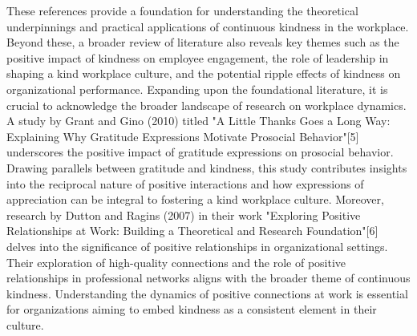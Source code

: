 \documentclass[a4paper, 11pt]{report}
\begin{document}
These references provide a foundation for understanding the theoretical underpinnings and practical applications of continuous kindness in the workplace. Beyond these, a broader review of literature also reveals key themes such as the positive impact of kindness on employee engagement, the role of leadership in shaping a kind workplace culture, and the potential ripple effects of kindness on organizational performance.
\vspace{5mm} %
\newline
Expanding upon the foundational literature, it is crucial to acknowledge the broader landscape of research on workplace dynamics. A study by Grant and Gino (2010) titled "A Little Thanks Goes a Long Way: Explaining Why Gratitude Expressions Motivate Prosocial Behavior"[5] underscores the positive impact of gratitude expressions on prosocial behavior. Drawing parallels between gratitude and kindness, this study contributes insights into the reciprocal nature of positive interactions and how expressions of appreciation can be integral to fostering a kind workplace culture.
\vspace{5mm} %
\newline
Moreover, research by Dutton and Ragins (2007) in their work "Exploring Positive Relationships at Work: Building a Theoretical and Research Foundation"[6] delves into the significance of positive relationships in organizational settings. Their exploration of high-quality connections and the role of positive relationships in professional networks aligns with the broader theme of continuous kindness. Understanding the dynamics of positive connections at work is essential for organizations aiming to embed kindness as a consistent element in their culture.
\end{document}
